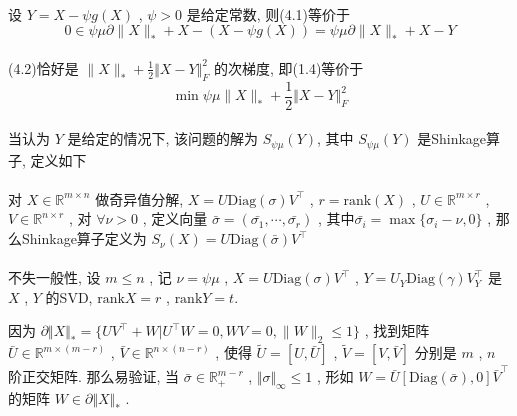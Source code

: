 \documentclass[UTF8]{ctexart}
\newcommand{\norm}[1]{\lVert#1\rVert}
\newcommand{\Real}[1]{\mathbb{R}^{#1}}
\newcommand{\nunorm}{\norm{X}_*}
\numberwithin{equation}{section}
\begin{document}
		\paragraph{}
			\quad 设 $Y = X - \psi g(X)$ , $\psi > 0$ 是给定常数, 则(4.1)等价于
				\begin{equation}
					0 \in \psi \mu \partial \nunorm + X - (X - \psi g(X)) = \psi \mu \partial \nunorm + X -Y
				\end{equation}

		\paragraph{}
			\quad (4.2)恰好是 $\nunorm + \frac{1}{2} \Vert{X - Y}\Vert^2_F$ 的次梯度, 即(1.4)等价于 
				\begin{equation}
					\min \psi \mu \nunorm + \frac{1}{2} \Vert{X - Y}\Vert^2_F
				\end{equation}

		\paragraph{}
			\quad 当认为 $Y$ 是给定的情况下, 该问题的解为 $S_{\psi \mu}(Y)$, 其中 $S_{\psi \mu}(Y)$ 是Shinkage算子, 定义如下
		
		\paragraph{}
			\quad 对 $X \in \Real{m \times n}$ 做奇异值分解, $X = U \text{Diag}(\sigma) V ^\top$ , $r = \text{rank}(X)$ , $U \in \Real{m \times r}$ , $V \in \Real{n \times r}$ , 对 $\forall \nu > 0$ , 定义向量 $\bar{\sigma} = (\bar{\sigma_1}, \cdots, \bar{\sigma_r})$ , 其中$\bar{\sigma_i} = \max \{\sigma_i - \nu, 0\}$ , 那么Shinkage算子定义为 $S_\nu(X) = U \text{Diag}(\bar{\sigma}) V ^\top$

		\paragraph{}
			\quad 不失一般性, 设 $m \le n$ , 记 $\nu = \psi \mu$ , $X = U \text{Diag}(\sigma) V ^\top$ , $Y = U_Y \text{Diag}(\gamma) V_Y ^\top$ 是 $X$ , $Y$ 的SVD, $\text{rank} X = r$ , $\text{rank} Y = t$.
		
			因为 $\partial \Vert{X}\Vert_* = \{UV^\top+W\vert U^\top W=0,WV=0,\norm{W}_2\leq1\}$ , 找到矩阵 $\bar{U} \in \Real{m \times (m - r)}$ , $\bar{V} \in \Real{n \times (n - r)}$ , 使得 $\tilde{U} = [U, \bar{U}]$ , $\tilde{V} = [V, \bar{V}]$ 分别是 $m$ , $n$ 阶正交矩阵. 那么易验证, 当 $\bar{\sigma} \in \Real{m-r}_+$ , $\Vert{\sigma}\Vert_\infty \le 1$ , 形如 $W = \bar{U}[\text{Diag}(\bar{\sigma}), 0]\bar{V} ^\top$ 的矩阵 $W \in \partial \Vert{X}\Vert_*$ .
\end{document}
